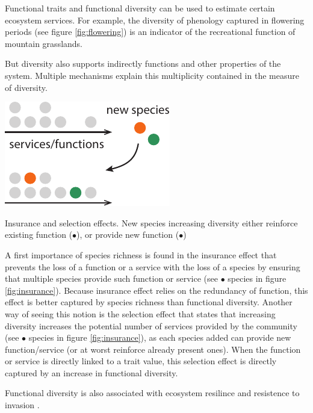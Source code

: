 Functional traits and functional diversity can be used to estimate certain ecosystem services. For example, the diversity of phenology captured in flowering periods (see figure \ref{fig:flowering}) is an indicator of the recreational function of mountain grasslands.

But diversity also supports indirectly functions and other properties of the system. Multiple mechanisms explain this multiplicity contained in the measure of diversity. 

\begin{marginfigure}
    \includegraphics{./Figures/insurance_m.pdf}
  \caption[Diversity insurance effect]{Insurance and selection effects. New species increasing diversity either reinforce existing function (\textcolor{myOrange}{$\bullet$}), or provide new function (\textcolor{myGreen}{$\bullet$})}
  \label{fig:insurance}
\end{marginfigure}


A first importance of species richness is found in the insurance effect that prevents the loss of a function or a service with the loss of a species by ensuring that multiple species provide such function or service (see \textcolor{myOrange}{$\bullet$} species in figure \ref{fig:insurance}). Because insurance effect relies on the redundancy of function, this effect is better captured by species richness than functional diversity. Another way of seeing this notion is the selection effect that states that increasing diversity increases the potential number of services provided by the community (see \textcolor{myGreen}{$\bullet$} species in figure \ref{fig:insurance}), as each species added can provide new function/service (or at worst reinforce already present ones). When the function or service is directly linked to a trait value, this selection effect is directly captured by an increase in functional diversity.

Functional diversity is also associated with ecosystem resilince \parencite{mori_response_2013} and resistence to invasion \parencite{bennett_species_2016}.\\

